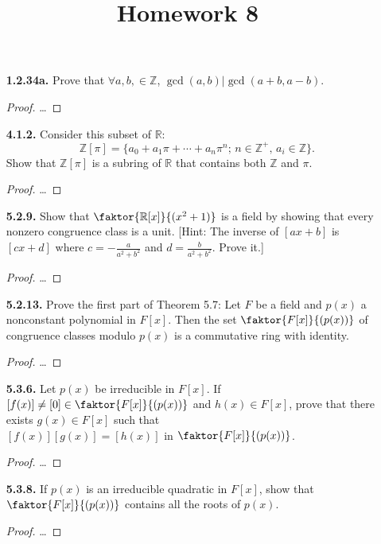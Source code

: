 \documentclass[12pt]{article}
\title{Homework 8}
\newcommand{\zee}{\mathbb{Z}}
\newcommand{\arr}{\mathbb{R}}
\begin{document}
\begin{itemize}
	\item[\textbf{ 1.2.34a.}] Prove that $\forall a,b,\in \zee$, $\gcd(a,b) | \gcd(a+b,a-b)$.
	\begin{proof}
	\dots
	\end{proof}

	\item[\textbf{ 4.1.2.}] Consider this subset of $\arr$:
	\[
		\zee[\pi] = \{ a_0 + a_1 \pi + \dotsb + a_n \pi^{n} \text{; } n\in\zee^{+} \text{, } {a_i}\in \zee \}\text{.}
	\]
	Show that $\zee[\pi]$ is a subring of $\arr$ that contains both $\zee$ and $\pi$.
	\begin{proof}
	\dots
	\end{proof}

	\item[\textbf{5.2.9.}] Show that $ \faktor{\arr[x]}{(x^2+1)}$ is a field by showing that every nonzero congruence class is a unit.
	[Hint: The inverse of $[ax+b]$ is $[cx+d]$ where $c=-\frac{a}{a^2+b^2}$ and $d=\frac{b}{a^2+b^2}$. Prove it.]
	\begin{proof}
	\dots
	\end{proof}

	\item[\textbf{ 5.2.13.}] Prove the first part of Theorem 5.7:
	Let $F$ be a field and $p(x)$ a nonconstant polynomial in $F[x]$. Then the set $\faktor{F[x]}{(p(x))}$ of congruence classes modulo $p(x)$ is a commutative ring with identity.
	\begin{proof}
	\dots
	\end{proof}

	\item[\textbf{ 5.3.6.}] Let $p(x)$ be irreducible in $F[x]$. If $[f(x)]\ne [0] \in \faktor{F[x]}{(p(x))}$ and $h(x)\in F[x]$, prove that there exists $g(x)\in F[x]$ such that\\ $[f(x)][g(x)]=[h(x)]$ in $\faktor{F[x]}{(p(x))}$.
	\begin{proof}
	\dots
	\end{proof}

	\item[\textbf{ 5.3.8.}] If $p(x)$ is an irreducible quadratic in $F[x]$, show that $\faktor{F[x]}{(p(x))}$ contains all the roots of $p(x)$.
	\begin{proof}
	\dots
	\end{proof}


\end{itemize}
\end{document}
